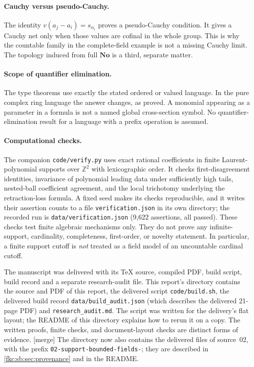 \documentclass[11pt,letterpaper]{article}
\numberwithin{equation}{section}
\theoremstyle{definition}
\theoremstyle{remark}
\newcommand{\No}{\mathbf{No}}
\newcommand{\mergetag}{\textup{\textsf{\small[merge]}}}%
\begin{document}
\paragraph{Cauchy versus pseudo-Cauchy.}
The identity $v(a_j-a_i)=s_{\alpha_i}$ proves a pseudo-Cauchy condition. It gives a Cauchy net only when those values are cofinal in the whole group. This is why the countable family in the complete-field example is not a missing Cauchy limit. The topology induced from full $\No$ is a third, separate matter.

\paragraph{Scope of quantifier elimination.}
The type theorems use exactly the stated ordered or valued language. In the pure complex ring language the answer changes, as proved. A monomial appearing as a parameter in a formula is not a named global cross-section symbol. No quantifier-elimination result for a language with a prefix operation is assumed.

\paragraph{Computational checks.}
The companion \texttt{code/verify.py} uses exact rational coefficients in finite Laurent-polynomial supports over $\mathbb Z^2$ with lexicographic order. It checks first-disagreement identities, invariance of polynomial leading data under sufficiently high tails, nested-ball coefficient agreement, and the local trichotomy underlying the retraction-loss formula. A fixed seed makes its checks reproducible, and it writes their assertion counts to a file \texttt{verification.json} in its own directory; the recorded run is \texttt{data/verification.json} (9,622 assertions, all passed). These checks test finite algebraic mechanisms only. They do not prove any infinite-support, cardinality, completeness, first-order, or novelty statement. In particular, a finite support cutoff is \emph{not} treated as a field model of an uncountable cardinal cutoff.

The manuscript was delivered with its TeX source, compiled PDF, build script, build record and a separate research-audit file. This report's directory contains the source and PDF of this report, the delivered script \texttt{code/build.sh}, the delivered build record \texttt{data/build\_audit.json} (which describes the delivered 21-page PDF) and \texttt{research\_audit.md}. The script was written for the delivery's flat layout; the README of this directory explains how to rerun it on a copy. The written proofs, finite checks, and document-layout checks are distinct forms of evidence. \mergetag{} The directory now also contains the delivered files of source~02, with the prefix \texttt{02-support-bounded-fields-}; they are described in \cref{fkc:sb:sec:provenance} and in the README.
\end{document}
